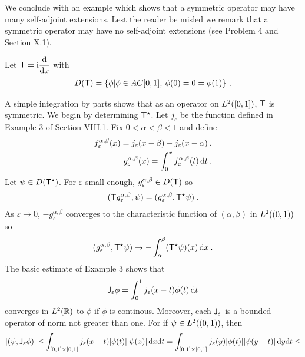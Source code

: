 We conclude with an example which shows that a symmetric operator may have many self-adjoint extensions. Lest the reader be misled we remark that a symmetric operator may have no self-adjoint extensions (see Problem 4 and Section X.1).

\begin{example}
    Let $\mathsf{T} = \mathrm{i} \dfrac{\mathrm{d}}{\mathrm{d}x}$ with \begin{align}
        D(\mathsf{T}) = \left \lbrace \phi | \phi \in AC[0,1], \: \phi(0)=0= \phi(1) \right \rbrace \:.
    \end{align}

A simple integration by parts shows that as an operator on $L^{2}([0,1])$, $\mathsf{T}$ is
symmetric. We begin by determining $\mathsf{T}^\star$. Let $j_\varepsilon$ be the function defined in Example 3 of Section VIII.1. Fix $0 <\alpha < \beta <1 $ and define  \begin{align}
    f_\varepsilon^{\alpha, \beta} (x) = j_\varepsilon(x-\beta) - j_\varepsilon(x - \alpha) \:, \\
    g_\varepsilon^{\alpha, \beta} (x) = \int_0^x f_\varepsilon^{\alpha, \beta} (t) \, \mathrm{d} t \:.
\end{align}
Let $\psi \in D(\mathsf{T}^\star)$. For $\varepsilon$ small enough, $g_\varepsilon^{\alpha, \beta} \in D(\mathsf{T})$ so \begin{align}
    (\mathsf{T} g_\varepsilon^{\alpha, \beta} , \psi) =(g_\varepsilon^{\alpha, \beta}, \mathsf{T}^\star \psi) \:.
\end{align}
As $\varepsilon \rightarrow 0$, $-g_\varepsilon^{\alpha, \beta}$ converges to the characteristic function of $(\alpha, \beta)$ in $L^{2}((0,1))$ so 
\begin{align}
    (g_\varepsilon^{\alpha, \beta}, \mathsf{T}^\star \psi) \rightarrow - \int_\alpha^\beta (\mathsf{T}^\star \psi)(x) \, \mathrm{d} x \:.
\end{align}
The basic estimate of Example 3 shows that \begin{align}
    \mathsf{J}_\varepsilon \phi = \int_0^1 j_\varepsilon(x-t)\phi(t)\, \mathrm{d} t
\end{align}
converges in $L^{2}(\mathbb{R})$ to $\phi$ if $\phi$ is continous. Moreover, each $\mathsf{J}_\varepsilon$ is a bounded operator of norm not greater than one. For if $\psi \in L^{2}((0,1))$, then \begin{align}
    |(\psi, \op J_\varepsilon \phi)| 
    \leq&
     \int_{[0,1]\times [0,1]} j_\varepsilon(x-t) |\phi(t)| |\psi(x)| \, \D x \D t 
    =
     \int_{[0,1]\times [0,1]} j_\varepsilon(y) |\phi(t)| |\psi(y+t)| \, \D y \D t 
     \leq \\ 

\end{align}
\end{example}
